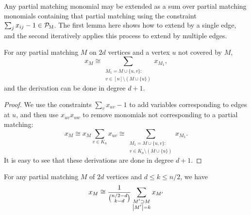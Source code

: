 Any partial matching monomial may be extended as a sum over partial matching monomials containing that partial matching using the constraint $\sum_j x_{ij} - 1 \in \mathcal P_{\textsc{M}}$. The first lemma here shows how to extend by a single edge, and the second iteratively applies this process to extend by multiple edges.
\begin{lemma}
  \label{lem:matching+a}
  For any partial matching \(M\) on \(2d\) vertices
  and a vertex \(u\) not covered by \(M\),
  \begin{equation}
    \label{eq:matching+a}
    x_{M}
    \cong
    \sum_{\substack{M_{1} = M \cup \{u,v\}: \\
        v \in [n] \setminus (M \cup \{u\})}}
    x_{M_{1}}
    ,
  \end{equation}
	and the derivation can be done in degree $d+1$.
\end{lemma}
\begin{proof}
We use the constraints \(\sum_{v} x_{uv} - 1\)
to add variables corresponding to edges at \(u\),
and then use \(x_{uv} x_{uw}\) to remove monomials
not corresponding to a partial matching:
\begin{equation*}
  x_{M}
  \cong
  x_{M} \sum_{v \in K_n} x_{uv}
  \cong
  \sum_{\substack{M_{1} = M \cup \{u,v\}: \\
      v \in K_{n} \setminus (M \cup \{u\})}}
  x_{M_{1}}
  .
\end{equation*}
It is easy to see that these derivations are done in degree $d+1$.
\end{proof}
\begin{lemma}
  \label{lem:partial-matching}
  For any partial matching \(M\) of \(2d\) vertices
  and \(d \leq k \leq n/2\),
  we have
  \begin{equation}
    \label{eq:partial-matching}
    x_{M} \cong
    \frac{1}{\binom{n/2 - d}{k - d}}
    \sum_{\substack{M' \supset M \\ \left|M'\right| = k}} x_{M'}
  \end{equation}
\end{lemma}
